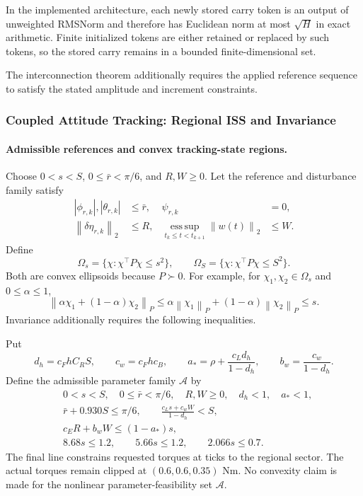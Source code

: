 \documentclass[12pt, a4paper]{article}
\begin{document}
In the implemented architecture, each newly stored carry token is an
output of unweighted RMSNorm and therefore has Euclidean norm at most
$\sqrt H$ in exact arithmetic. Finite initialized tokens are either
retained or replaced by such tokens, so the stored carry remains in a
bounded finite-dimensional set. 

The interconnection theorem additionally requires the applied reference
sequence to satisfy the stated amplitude and increment constraints.

\subsubsection{Coupled Attitude Tracking: Regional ISS and Invariance}
\label{sec:cascade}
\paragraph{Admissible references and convex tracking-state regions.}
\label{uhrc:sec:admissibility}

Choose $0<s<S$, $0\le\bar r<\pi/6$, and $R,W\ge0$. Let the reference and
disturbance family satisfy
\begin{align}
 |\phi_{r,k}|,|\theta_{r,k}|&\le\bar r,&\psi_{r,k}&=0,\nonumber\\
 \left\lVert \delta\eta_{r,k}\right\rVert_{2}&\le R,&
 \operatorname*{ess\,sup}_{t_k\le t<t_{k+1}}\left\lVert w(t)\right\rVert_{2}&\le W.
 \label{eq:admissible_references}
\end{align}
Define
\begin{equation}
 \Omega_s=\{\chi:\chi^\top P\chi\le s^2\},\qquad
 \Omega_S=\{\chi:\chi^\top P\chi\le S^2\}.
 \label{uhrc:eq:ellipsoids}
\end{equation}
Both are convex ellipsoids because $P\succ0$. For example, for
$\chi_1,\chi_2\in\Omega_s$ and $0\le\alpha\le1$,
\[
 \left\lVert \alpha\chi_1+(1-\alpha)\chi_2\right\rVert_{P}
 \le\alpha\left\lVert \chi_1\right\rVert_{P}+(1-\alpha)\left\lVert \chi_2\right\rVert_{P}\le s.
\]
Invariance additionally requires the following inequalities.

Put
\begin{equation}
 d_h=c_FhC_RS,\qquad c_w=c_Fhc_B,\qquad
 a_* =\rho+\frac{c_Ld_h}{1-d_h},\qquad
 b_w=\frac{c_w}{1-d_h}.
 \label{eq:nonlinear_constants}
\end{equation}
Define the admissible parameter family $\mathcal A$ by
\begin{align}
 &0<s<S,\quad 0\le\bar r<\pi/6,\quad R,W\ge0,
       \quad d_h<1,\quad a_*<1,\label{uhrc:eq:admissible-a}\\
 &\bar r+0.930S\le\pi/6,
       \qquad \frac{c_Ls+c_wW}{1-d_h}<S,\label{uhrc:eq:admissible-b}\\
 &c_ER+b_wW\le(1-a_*)s,\label{uhrc:eq:admissible-c}\\
 &8.68s\le1.2,\qquad5.66s\le1.2,\qquad2.066s\le0.7.
 \label{uhrc:eq:admissible-d}
\end{align}
The final line constrains requested torques at ticks to the regional sector.
The actual torques remain clipped at $(0.6,0.6,0.35)$ Nm.
No convexity claim is made for the nonlinear parameter-feasibility set
$\mathcal A$.
\end{document}
